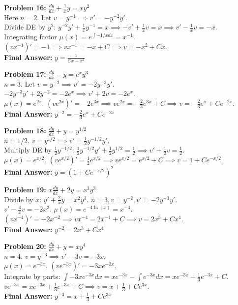 \documentclass[12pt]{article}
\begin{document}
\textbf{Problem 16:} $\frac{dy}{dx} + \frac{1}{x}y = x y^2$ \\
Here $n=2$. Let $v = y^{-1} \implies v' = -y^{-2}y'$. \\
Divide DE by $y^2$: $y^{-2}y' + \frac{1}{x}y^{-1} = x \implies -v' + \frac{1}{x}v = x \implies v' - \frac{1}{x}v = -x$. \\
Integrating factor $\mu(x) = e^{\int -1/x dx} = x^{-1}$. \\
$(vx^{-1})' = -1 \implies vx^{-1} = -x + C \implies v = -x^2 + Cx$. \\
\textbf{Final Answer:} $y = \frac{1}{Cx - x^2}$

\vspace{10pt}
\textbf{Problem 17:} $\frac{dy}{dx} - y = e^x y^3$ \\
$n=3$. Let $v = y^{-2} \implies v' = -2y^{-3}y'$. \\
$-2y^{-3}y' + 2y^{-2} = -2e^x \implies v' + 2v = -2e^x$. \\
$\mu(x) = e^{2x}$. $(ve^{2x})' = -2e^{3x} \implies ve^{2x} = -\frac{2}{3}e^{3x} + C \implies v = -\frac{2}{3}e^x + Ce^{-2x}$. \\
\textbf{Final Answer:} $y^{-2} = -\frac{2}{3}e^x + Ce^{-2x}$

\vspace{10pt}
\textbf{Problem 18:} $\frac{dy}{dx} + y = y^{1/2}$ \\
$n=1/2$. $v = y^{1/2} \implies v' = \frac{1}{2}y^{-1/2}y'$. \\
Multiply DE by $\frac{1}{2}y^{-1/2}$: $\frac{1}{2}y^{-1/2}y' + \frac{1}{2}y^{1/2} = \frac{1}{2} \implies v' + \frac{1}{2}v = \frac{1}{2}$. \\
$\mu(x) = e^{x/2}$. $(ve^{x/2})' = \frac{1}{2}e^{x/2} \implies ve^{x/2} = e^{x/2} + C \implies v = 1 + Ce^{-x/2}$. \\
\textbf{Final Answer:} $y = (1 + Ce^{-x/2})^2$

\vspace{10pt}
\textbf{Problem 19:} $x \frac{dy}{dx} + 2y = x^3 y^3$ \\
Divide by $x$: $y' + \frac{2}{x}y = x^2 y^3$. $n=3, v = y^{-2}, v' = -2y^{-3}y'$. \\
$v' - \frac{4}{x}v = -2x^2$. $\mu(x) = e^{-4\ln(x)} = x^{-4}$. \\
$(vx^{-4})' = -2x^{-2} \implies vx^{-4} = 2x^{-1} + C \implies v = 2x^3 + Cx^4$. \\
\textbf{Final Answer:} $y^{-2} = 2x^3 + Cx^4$

\vspace{10pt}
\textbf{Problem 20:} $\frac{dy}{dx} + y = x y^4$ \\
$n=4$. $v = y^{-3} \implies v' - 3v = -3x$. \\
$\mu(x) = e^{-3x}$. $(ve^{-3x})' = -3x e^{-3x}$. \\
Integrate by parts: $\int -3x e^{-3x}dx = xe^{-3x} - \int e^{-3x}dx = xe^{-3x} + \frac{1}{3}e^{-3x} + C$. \\
$ve^{-3x} = xe^{-3x} + \frac{1}{3}e^{-3x} + C \implies v = x + \frac{1}{3} + Ce^{3x}$. \\
\textbf{Final Answer:} $y^{-3} = x + \frac{1}{3} + Ce^{3x}$
\end{document}
